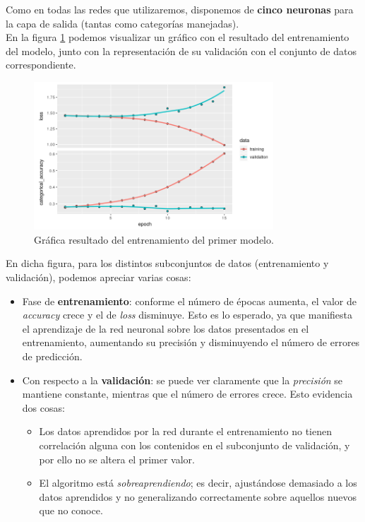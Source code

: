 \documentclass[]{article}
\begin{document}
		Como en todas las redes que utilizaremos, disponemos de \textbf{cinco neuronas} para la capa de salida (tantas como categorías manejadas).\\
		
		En la figura \ref{first-nn} podemos visualizar un gráfico con el resultado del entrenamiento del modelo, junto con la representación de su validación con el conjunto de datos correspondiente.
	
		\begin{figure}[h]
			\centering
			\includegraphics[width=0.8\textwidth]{./img/model1}
			\caption{Gráfica resultado del entrenamiento del primer modelo.}
			\label{first-nn}
		\end{figure}
	
		En dicha figura, para los distintos subconjuntos de datos (entrenamiento y validación), podemos apreciar varias cosas:
		
		\begin{itemize}
			\item Fase de \textbf{entrenamiento}: conforme el número de épocas aumenta, el valor de \textit{accuracy} crece y el de \textit{loss} disminuye. Esto es lo esperado, ya que manifiesta el aprendizaje de la red neuronal sobre los datos presentados en el entrenamiento, aumentando su precisión y disminuyendo el número de errores de predicción.
			\item Con respecto a la \textbf{validación}: se puede ver claramente que la \textit{precisión} se mantiene constante, mientras que el número de errores crece. Esto evidencia dos cosas: \begin{itemize}
				\item Los datos aprendidos por la red durante el entrenamiento no tienen correlación alguna con los contenidos en el subconjunto de validación, y por ello no se altera el primer valor.
				\item El algoritmo está \textit{sobreaprendiendo}; es decir, ajustándose demasiado a los datos aprendidos y no generalizando correctamente sobre aquellos nuevos que no conoce.
			\end{itemize}
		\end{itemize}
	
\end{document}
